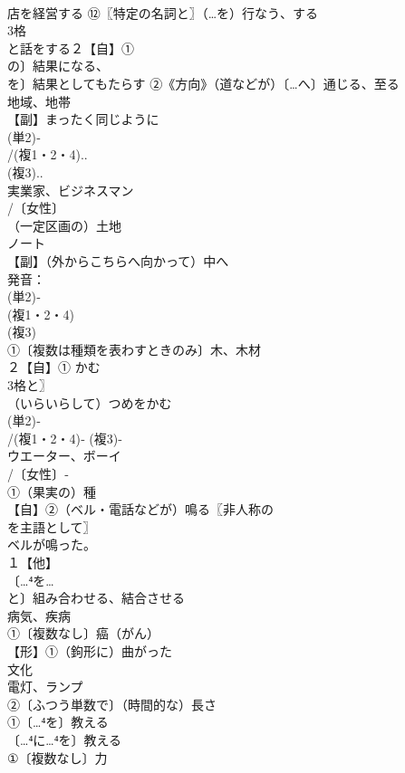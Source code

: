 \documentclass[8pt]{extreport}
\begin{document}
\begin{CJK}{UTF8}{min}
\\	店を経営する ⑫〖特定の名詞と〗（…を）行なう、する 
\\	3格 
\\	と話をする２【自】①
\\	の〕結果になる、
\\	を〕結果としてもたらす ②《方向》（道などが）〔…へ〕通じる、至る 
\\	地域、地帯 
\\	【副】まったく同じように
\\	(単2)‐
\\	/(複1・2・4)..
\\	(複3)..
\\	実業家、ビジネスマン 
\\	/〔女性〕
\\	（一定区画の）土地
\\	ノート 
\\	【副】（外からこちらへ向かって）中へ 
\\	発音：
\\	(単2)‐
\\	(複1・2・4)
\\	(複3)
\\	①〔複数は種類を表わすときのみ〕木、木材 
\\	２【自】① かむ 
\\	3格と〗
\\	（いらいらして）つめをかむ
\\	(単2)‐
\\	/(複1・2・4)‐ (複3)‐
\\	ウエーター、ボーイ 
\\	/〔女性〕‐
\\	①（果実の）種
\\	【自】②（ベル・電話などが）鳴る〖非人称の
\\	を主語として〗
\\	ベルが鳴った。
\\	１【他】
\\	〔…⁴を…
\\	と〕組み合わせる、結合させる 
\\	病気、疾病 
\\	①〔複数なし〕癌（がん）
\\	【形】①（鉤形に）曲がった
\\	文化 
\\	電灯、ランプ 
\\	②〔ふつう単数で〕（時間的な）長さ
\\	①〔…⁴を〕教える 
\\	〔…⁴に…⁴を〕教える
\\	①〔複数なし〕力 

\end{CJK}
\end{document}
